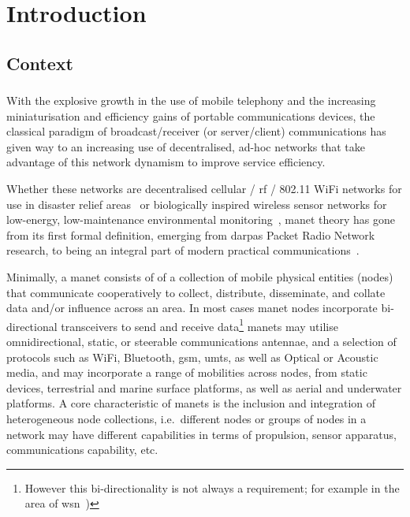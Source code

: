 
\chapter{Introduction}
\label{ch:introduction}

\section{Context}

\subsection{}\label{manets}

With the explosive growth in the use of mobile telephony and the increasing miniaturisation and efficiency gains of portable communications devices, the classical paradigm of broadcast/receiver (or server/client) communications has given way to an increasing use of decentralised, ad-hoc networks that take advantage of this network dynamism to improve service efficiency.

Whether these networks are decentralised cellular / \gls{rf} / 802.11 WiFi networks for use in disaster relief areas~\cite{Milliken2015} or biologically inspired wireless sensor networks for low-energy, low-maintenance environmental monitoring~\cite{Nicholson2008,Selvakennedy2007}, \gls{manet} theory has gone from its first formal definition, emerging from \glspl{darpa} Packet Radio Network research, to being an integral part of modern practical communications~\cite{Jubin1987}.

Minimally, a \gls{manet} consists of of a collection of mobile physical entities (nodes) that communicate cooperatively to collect, distribute, disseminate, and collate data and/or influence across an area.
In most cases \gls{manet} nodes incorporate bi-directional transceivers to send and receive data\footnote{However this bi-directionality is not always a requirement; for example in the area of \gls{wsn}~\cite{Akyildiz2002})}
\glspl{manet} may utilise omnidirectional, static, or steerable communications antennae, and a selection of protocols such as WiFi, Bluetooth, \gls{gsm}, \gls{umts}, as well as Optical or Acoustic media, and may incorporate a range of mobilities across nodes, from static devices, terrestrial and marine surface platforms, as well as aerial and underwater platforms.
A core characteristic of \glspl{manet} is the inclusion and integration of heterogeneous node collections, i.e.\ different nodes or groups of nodes in a network may have different capabilities in terms of propulsion, sensor apparatus, communications capability, etc.

